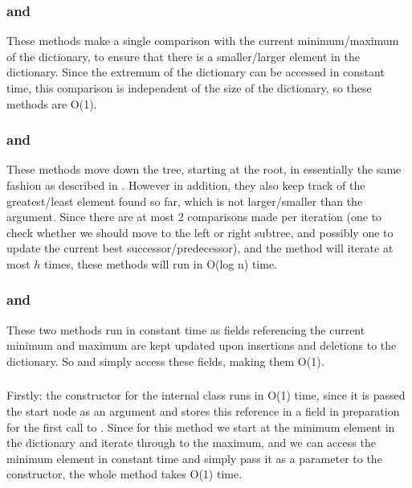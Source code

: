 \subsubsection{ and }
These methods make a single comparison with the current minimum/maximum of the dictionary, to ensure that there is a smaller/larger element in the dictionary. Since the extremum of the dictionary can be accessed in constant time, this comparison is independent of the size of the dictionary, so these methods are O(1).

\subsubsection{ and }
These methods move down the tree, starting at the root, in essentially the same fashion as described in . However in addition, they also keep track of the greatest/least element found so far, which is not larger/smaller than the argument. Since there are at most 2 comparisons made per iteration (one to check whether we should move to the left or right subtree, and possibly one to update the current best successor/predecessor), and the method will iterate at most $h$ times, these methods will run in O(log n) time.

\subsubsection{ and }
These two methods run in constant time as fields referencing the current minimum and maximum are kept updated upon insertions and deletions to the dictionary. So  and  simply access these fields, making them O(1).

\subsubsection{}

\subsubsection{}

\subsubsection{}
Firstly: the constructor for the internal class  runs in O(1) time, since it is passed the start node as an argument and stores this reference in a field in preparation for the first call to . Since for this method we start at the minimum element in the dictionary and iterate through to the maximum, and we can access the minimum element in constant time and simply pass it as a parameter to the  constructor, the whole method takes O(1) time.

